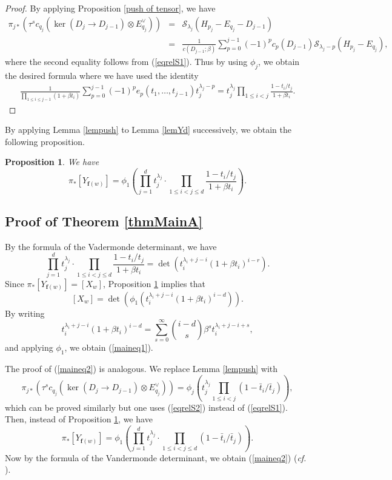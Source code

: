\documentclass[12pt, reqno,sumlimits]{amsart}
\newtheorem{prop}[thm]{Proposition}
\theoremstyle{definition}
\numberwithin{equation}{section}
\newcommand{\bff}{{\mathbf f }}
\newcommand{\scS}{{\mathscr S}}
\begin{document}
\begin{proof}
By applying Proposition \ref{push of tensor}, we have
\begin{eqnarray*}
\pi_{j*}(\tau^sc_{q_j}(\ker(D_j \to D_{j-1})\otimes E_{q_j}^{\vee})) 
&=&\scS_{\lambda_j}(H_{p_j}- E_{q_j} -D_{j-1})\\
&=& \frac{1}{c(D_{j-1};\beta)}\sum_{p=0}^{j-1} (-1)^p c_p(D_{j-1})\scS_{\lambda_j-p}(H_{p_j}- E_{q_j}),
\end{eqnarray*}
where the second equality follows from (\ref{eqrelS1}). Thus by using $\phi_j$, we obtain the desired formula where we have used the identity
\begin{eqnarray*}
\frac{1}{\prod_{1\leq i\leq j-1} (1+\beta t_i)} \sum_{p=0}^{j-1} (-1)^p e_p(t_1,\dots,t_{j-1}) t_j^{\lambda_j-p}
=t_j^{\lambda_j} \prod_{1\leq i< j} \frac{1 - t_i/t_j}{1+\beta t_i}.
\end{eqnarray*}
\end{proof}
By applying Lemma \ref{lempush} to Lemma \ref{lemYd} successively, we obtain the following proposition.
\begin{prop}\label{propMainA}
We have
\[
\pi_*[Y_{\bff(w)}] = \phi_1\left(\prod_{j=1}^d t_j^{\lambda_j} \cdot \prod_{1\leq i< j\leq d} \frac{1 - t_i/t_j}{1+\beta t_i} \right).
\]
\end{prop}
\subsection{Proof of Theorem \ref{thmMainA}}
By the formula of the Vadermonde determinant, we have
\[
\prod_{j=1}^d t_j^{\lambda_j} \cdot \prod_{1\leq i< j\leq d} \frac{1 - t_i/t_j}{1+\beta t_i}  = \det\left( t_i^{\lambda_i+j-i} \left(1+\beta t_i\right)^{i-r} \right).
\]
Since $\pi_*[Y_{\bff(w)}]=[X_w]$, Proposition \ref{propMainA} implies that
\[
[X_w] = \det\left(\phi_1\left(t_i^{\lambda_i+j-i} \left(1+\beta t_i\right)^{i-d}\right)\right).
\]
By writing
\[
t_i^{\lambda_i+j-i} \left(1+\beta t_i\right)^{i-d}  = \sum_{s=0}^{\infty} \binom{i-d}{s} \beta^s t_i^{\lambda_i+j-i+s},
\]
and applying $\phi_1$, we obtain (\ref{maineq1}). 

The proof of (\ref{maineq2}) is analogous. We replace Lemma \ref{lempush} with  
\[
\pi_{j*}(\tau^sc_{q_j}(\ker(D_j \to D_{j-1}) \otimes E_{q_j}^{\vee})) =  \phi_j\left(t_j^{\lambda_j} \prod_{1\leq i< j} (1 - \bar t_i/\bar t_j) \right), 
\]
which can be proved similarly but one uses (\ref{eqrelS2}) instead of (\ref{eqrelS1}). Then, instead of Proposition \ref{propMainA}, we have 
\[
\pi_*[Y_{\bff(w)}] = \phi_1\left(\prod_{j=1}^d t_j^{\lambda_j} \cdot \prod_{1\leq i< j\leq d} (1 - \bar t_i/\bar t_j) \right).
\]
Now by the formula of the Vandermonde determinant, we obtain (\ref{maineq2}) ({\it cf.} \cite[Theorem 3.10.]{HIMN}).
\end{document}
